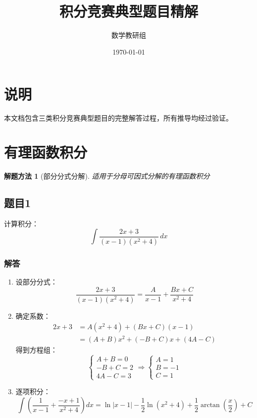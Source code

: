 \documentclass[12pt]{article}
\title{积分竞赛典型题目精解}
\author{数学教研组}
\date{\today}
\newtheorem{method}{解题方法}
\begin{document}
\maketitle

\section*{说明}
本文档包含三类积分竞赛典型题目的完整解答过程，所有推导均经过验证。

\section{有理函数积分}

\begin{method}[部分分式分解]
适用于分母可因式分解的有理函数积分
\end{method}

\subsection*{题目1}
计算积分：
\[ \int \frac{2x+3}{(x-1)(x^2+4)} \, dx \]

\subsubsection*{解答}
\begin{enumerate}[label=\arabic*]
\item 设部分分式：
\[ \frac{2x+3}{(x-1)(x^2+4)} = \frac{A}{x-1} + \frac{Bx+C}{x^2+4} \]

\item 确定系数：
\begin{align*}
2x + 3 &= A(x^2 + 4) + (Bx + C)(x - 1) \\
&= (A + B)x^2 + (-B + C)x + (4A - C)
\end{align*}
得到方程组：
\[
\begin{cases}
A + B = 0 \\
-B + C = 2 \\
4A - C = 3
\end{cases}
\Rightarrow
\begin{cases}
A = 1 \\
B = -1 \\
C = 1
\end{cases}
\]

\item 逐项积分：
\[
\int \left( \frac{1}{x-1} + \frac{-x+1}{x^2+4} \right) dx = \ln|x-1| - \frac{1}{2}\ln(x^2+4) + \frac{1}{2}\arctan\left(\frac{x}{2}\right) + C
\]
\end{enumerate}
\end{document}
